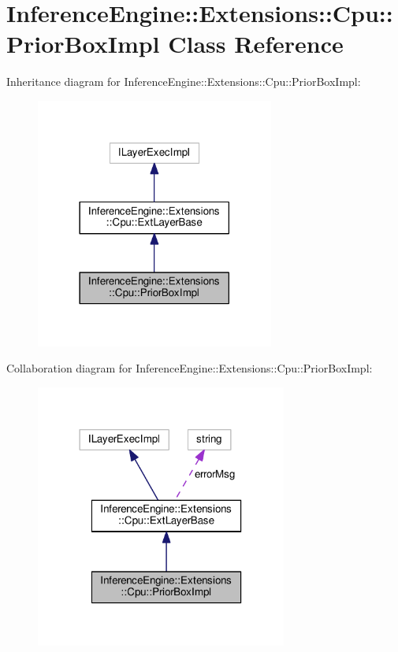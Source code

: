 \hypertarget{classInferenceEngine_1_1Extensions_1_1Cpu_1_1PriorBoxImpl}{}\section{Inference\+Engine\+:\+:Extensions\+:\+:Cpu\+:\+:Prior\+Box\+Impl Class Reference}
\label{classInferenceEngine_1_1Extensions_1_1Cpu_1_1PriorBoxImpl}


Inheritance diagram for Inference\+Engine\+:\+:Extensions\+:\+:Cpu\+:\+:Prior\+Box\+Impl\+:
\nopagebreak
\begin{figure}[H]
\begin{center}
\leavevmode
\includegraphics[width=222pt]{classInferenceEngine_1_1Extensions_1_1Cpu_1_1PriorBoxImpl__inherit__graph}
\end{center}
\end{figure}


Collaboration diagram for Inference\+Engine\+:\+:Extensions\+:\+:Cpu\+:\+:Prior\+Box\+Impl\+:
\nopagebreak
\begin{figure}[H]
\begin{center}
\leavevmode
\includegraphics[width=234pt]{classInferenceEngine_1_1Extensions_1_1Cpu_1_1PriorBoxImpl__coll__graph}
\end{center}
\end{figure}
